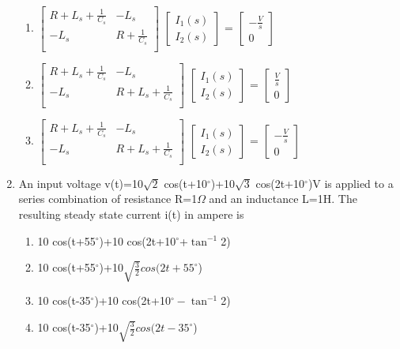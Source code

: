 \documentclass[journal,12pt,twocolumn]{IEEEtran}
\begin{document}
\begin{enumerate}
\begin{enumerate}
\item $\begin{bmatrix}
R+L_{s}+\frac{1}{C_{s}} & -L_{s}\\
-L_{s} & R+\frac{1}{C_{s}}\\
\end{bmatrix}$
\quad
$\begin{bmatrix}
I_{1}(s)\\
I_{2}(s)
\end{bmatrix}$
\quad =
$\begin{bmatrix}
-\frac{V}{s}\\
0
\end{bmatrix}$

\item $\begin{bmatrix}
R+L_{s}+\frac{1}{C_{s}} & -L_{s}\\
-L_{s} & R+L_{s}+\frac{1}{C_{s}}\\
\end{bmatrix}$
\quad
$\begin{bmatrix}
I_{1}(s)\\
I_{2}(s)
\end{bmatrix}$
\quad =
$\begin{bmatrix}
\frac{V}{s}\\
0
\end{bmatrix}$

\item $\begin{bmatrix}
R+L_{s}+\frac{1}{C_{s}} & -L_{s}\\
-L_{s} & R+L_{s}+\frac{1}{C_{s}}\\
\end{bmatrix}$
\quad
$\begin{bmatrix}
I_{1}(s)\\
I_{2}(s)
\end{bmatrix}$
\quad =
$\begin{bmatrix}
-\frac{V}{s}\\
0
\end{bmatrix}$
\end{enumerate}

\item An input voltage v(t)=10$\sqrt{2}$ cos(t+10$^{\circ}$)+10$\sqrt{3}$ cos(2t+10$^{\circ}$)V is applied to a series combination of resistance R=1$\Omega$ and an inductance L=1H. The resulting steady state current i(t) in ampere is
\begin{enumerate}
\setlength\itemsep{2em}
\item 10 cos(t+55$^{\circ}$)+10 cos(2t+10$^{\circ}$+$\tan^{-1}$2)
\item 10 cos(t+55$^{\circ}$)+10$\sqrt{\frac{3}{2}}cos(2t+55^{\circ}$)
\item 10 cos(t-35$^{\circ}$)+10 cos(2t+10$^{\circ}-\tan^{-1}$2)
\item 10 cos(t-35$^{\circ}$)+10$\sqrt{\frac{3}{2}}cos(2t-35^{\circ}$)
\end{enumerate}


\end{enumerate}
\end{document}

